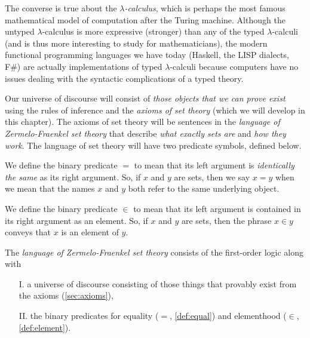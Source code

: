 \begin{note}
    The converse is true about the \emph{\(\lambda\)-calculus},
    which is perhaps the most famous mathematical model of computation after the Turing machine.
    Although the untyped \(\lambda\)-calculus is more expressive (\ie stronger)
    than any of the typed \(\lambda\)-calculi (and is thus more interesting to study for mathematicians),
    the modern functional programming languages we have today (\eg Haskell, the LISP dialects, F\#)
    are actually implementations of typed \(\lambda\)-calculi
    because computers have no issues dealing with the syntactic complications of a typed theory.
\end{note}

Our universe of discourse will consist of \emph{those objects that we can prove exist}
using the rules of inference and the \emph{axioms of set theory} (which we will develop in this chapter).
The axioms of set theory will be sentences in the \emph{language of Zermelo-Fraenkel set theory}
that describe \emph{what exactly sets are} and \emph{how they work}.
The language of set theory will have two predicate symbols, defined below.

\begin{definition}[Equality]\label{def:equal}
    We define the binary predicate \(=\) to mean that
    its left argument is \emph{identically the same} as its right argument.
    So, if \(x\) and \(y\) are sets, then we say \(x = y\)
    when we mean that the names \(x\) and \(y\) both refer to the same underlying object.
\end{definition}

\begin{definition}[Elementhood]\label{def:element}
    We define the binary predicate \(\in\) to mean that its left argument is
    contained in its right argument as an element.
    So, if \(x\) and \(y\) are sets, then the phrase \(x \in y\)
    conveys that \(x\) is an element of \(y\).
\end{definition}

\begin{definition}
    The \emph{language of Zermelo-Fraenkel set theory}
    consists of the first-order logic
    along with
    \begin{enumerate}
        \item[I.]
            a universe of discourse consisting of
            those things that provably exist from the axioms (\autoref{sec:axioms}),
        \item[II.]
            the binary predicates for equality (\(=\), \autoref{def:equal})
            and elementhood (\(\in\), \autoref{def:element}).
    \end{enumerate}
\end{definition}

